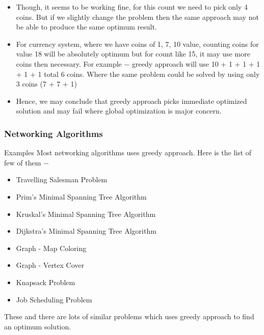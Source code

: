 \documentclass{beamer}
\begin{document}
\begin{frame}
\begin{itemize}
\item Though, it seems to be working fine, for this count we need to pick only 4 coins. But if we slightly change the problem then the same approach may not be able to produce the same optimum result.

\item For currency system, where we have coins of 1, 7, 10 value, counting coins for value 18 will be absolutely optimum but for count like 15, it may use more coins then necessary. For example − greedy approach will use 10 + 1 + 1 + 1 + 1 + 1 total 6 coins. Where the same problem could be solved by using only 3 coins (7 + 7 + 1)

\item Hence, we may conclude that greedy approach picks immediate optimized solution and may fail where global optimization is major concern.
\end{itemize}

\end{frame}
\begin{frame}
\frametitle{Networking Algorithms}
\large
Examples
Most networking algorithms uses greedy approach. Here is the list of few of them −
\begin{itemize}
\item Travelling Salesman Problem
\item Prim's Minimal Spanning Tree Algorithm
\item Kruskal's Minimal Spanning Tree Algorithm
\item Dijkstra's Minimal Spanning Tree Algorithm
\item Graph - Map Coloring
\item Graph - Vertex Cover
\item Knapsack Problem
\item Job Scheduling Problem
\end{itemize}
These and there are lots of similar problems which uses greedy approach to find an optimum solution.

\end{frame}

\end{document}
